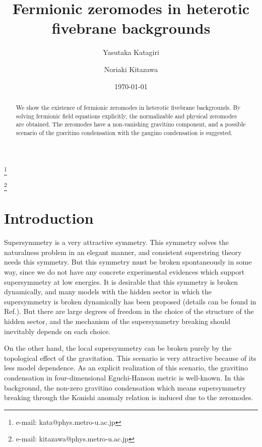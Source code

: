 \documentclass[a4paper,aps, amssymb, preprint, 12pt]{revtex4}
\begin{document}
\parbox{4cm}{\vspace*{2cm}}

\title{Fermionic zeromodes in heterotic fivebrane backgrounds}
\author{Yasutaka Katagiri}
\thanks{e-mail: kata@phys.metro-u.ac.jp}
\address{Department of Physics, Tokyo Metropolitan University, Hachioji, Tokyo 192-0397, Japan}
\date{\today}
\author{Noriaki Kitazawa}
\thanks{e-mail: kitazawa@phys.metro-u.ac.jp}
\address{Department of Physics, Tokyo Metropolitan University, Hachioji, Tokyo 192-0397, Japan}

\begin{abstract}
We show the existence of fermionic zeromodes in heterotic fivebrane backgrounds.
By solving fermionic field equations explicitly, the normalizable and physical zeromodes are obtained.
The zeromodes have a non-vanishing gravitino component, and a possible scenario of the gravitino condensation with the gaugino condensation is suggested.
\end{abstract}

\pacs{}
\maketitle

\newpage

\section{Introduction}
Supersymmetry is a very attractive symmetry.
This symmetry solves the naturalness problem in an elegant manner, and consistent superstring theory needs this symmetry.
But this symmetry must be broken spontaneously in some way, since we do not have any concrete experimental evidences which support supersymmetry at low energies.
It is desirable that this symmetry is broken dynamically, and many models with the hidden sector in which the supersymmetry is broken dynamically has been proposed (details can be found in Ref.\cite{treelevel_SUSY_breaking_1, treelevel_SUSY_breaking_2}).
But there are large degrees of freedom in the choice of the structure of the hidden sector, and the mechanism of the supersymmetry breaking should inevitably depends on each choice.

On the other hand, the local supersymmetry can be broken purely by the topological effect of the gravitation\cite{Witten}.
This scenario is very attractive because of its less model dependence.
As an explicit realization of this scenario, the gravitino condensation \coordHE{} in four-dimensional Eguchi-Hanson metric is well-known\cite{EH, Konishi}.
In this background, the non-zero gravitino condensation which means supersymmetry breaking through the Konishi anomaly relation is induced due to the zeromodes.
\end{document}
